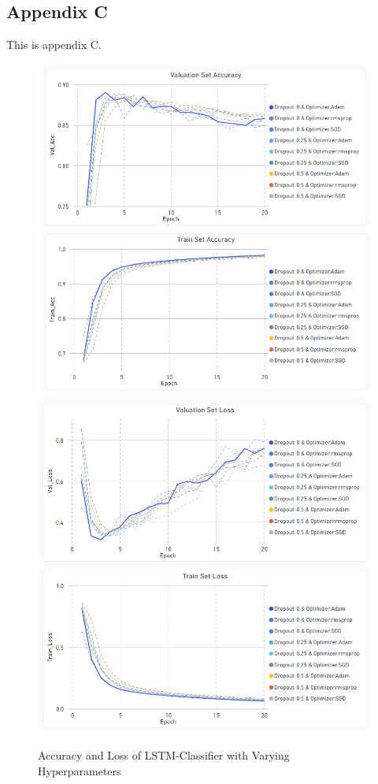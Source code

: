 \documentclass[11pt, a4paper]{article}
\begin{document}
\subsection{Appendix C}
This is appendix C.
\label{appendix:LSTM_Sentiment_Classifier}
\begin{figure}[!h]
    \centering
    \includegraphics[scale=0.43]{LSTM_Accuracy.png}
    \includegraphics[scale=0.43]{LSTM_Loss.png}
    \caption{Accuracy and Loss of LSTM-Classifier with Varying Hyperparameters}
    \label{fig:lstm_acc_loss}
\end{figure}
\end{document}
